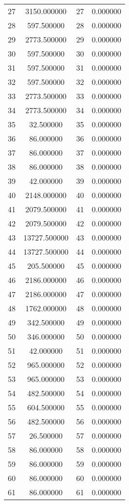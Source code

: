 \documentclass[12pt]{article}
\begin{document}
\begin{longtable}{@{}cccc@{}}
27 & 3150.000000 & 27 & 0.000000 \\
28 & 597.500000 & 28 & 0.000000 \\
29 & 2773.500000 & 29 & 0.000000 \\
30 & 597.500000 & 30 & 0.000000 \\
31 & 597.500000 & 31 & 0.000000 \\
32 & 597.500000 & 32 & 0.000000 \\
33 & 2773.500000 & 33 & 0.000000 \\
34 & 2773.500000 & 34 & 0.000000 \\
35 & 32.500000 & 35 & 0.000000 \\
36 & 86.000000 & 36 & 0.000000 \\
37 & 86.000000 & 37 & 0.000000 \\
38 & 86.000000 & 38 & 0.000000 \\
39 & 42.000000 & 39 & 0.000000 \\
40 & 2148.000000 & 40 & 0.000000 \\
41 & 2079.500000 & 41 & 0.000000 \\
42 & 2079.500000 & 42 & 0.000000 \\
43 & 13727.500000 & 43 & 0.000000 \\
44 & 13727.500000 & 44 & 0.000000 \\
45 & 205.500000 & 45 & 0.000000 \\
46 & 2186.000000 & 46 & 0.000000 \\
47 & 2186.000000 & 47 & 0.000000 \\
48 & 1762.000000 & 48 & 0.000000 \\
49 & 342.500000 & 49 & 0.000000 \\
50 & 346.000000 & 50 & 0.000000 \\
51 & 42.000000 & 51 & 0.000000 \\
52 & 965.000000 & 52 & 0.000000 \\
53 & 965.000000 & 53 & 0.000000 \\
54 & 482.500000 & 54 & 0.000000 \\
55 & 604.500000 & 55 & 0.000000 \\
56 & 482.500000 & 56 & 0.000000 \\
57 & 26.500000 & 57 & 0.000000 \\
58 & 86.000000 & 58 & 0.000000 \\
59 & 86.000000 & 59 & 0.000000 \\
60 & 86.000000 & 60 & 0.000000 \\
61 & 86.000000 & 61 & 0.000000 \\

\end{longtable}
\end{document}
